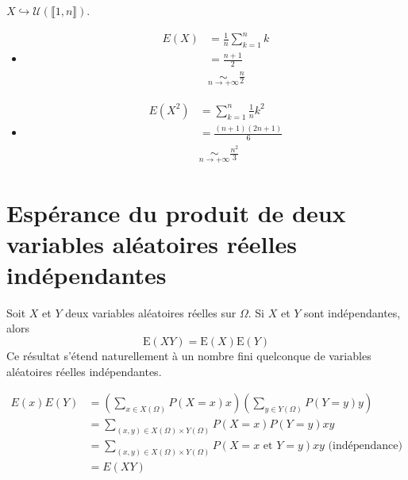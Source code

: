 \documentclass[../main.tex]{subfiles}
\begin{document}
\noindent $X\hookrightarrow \mathcal{U}(\llbracket 1, n \rrbracket)$. 
\begin{itemize}
    \item \begin{align*}
        E(X) &= \frac{1}{n} \sum_{k=1}^{n} k \\
        &= \frac{n+1}{2} \\
        &\underset{n\to +\infty}{\sim} \frac{n}{2}
    \end{align*}
    \item \begin{align*}
        E(X^2) &= \sum_{k=1}^{n} \frac{1}{n} k^2 \\
        &= \frac{(n+1)(2n+1)}{6} \\
        &\underset{n\to +\infty}{\sim} \frac{n^2}{3}
    \end{align*}
\end{itemize}

\section{Espérance du produit de deux variables aléatoires réelles indépendantes}
\begin{tcolorbox}[title=Théorème 33.11, title filled=false, colframe=orange, colback=orange!10!white]
    Soit $X$ et $Y$ deux variables aléatoires réelles sur $\Omega$. Si $X$ et $Y$ sont indépendantes, alors
    $$\mathrm{E}(X Y)=\mathrm{E}(X) \mathrm{E}(Y)$$
    Ce résultat s'étend naturellement à un nombre fini quelconque de variables aléatoires réelles indépendantes.
\end{tcolorbox}

\begin{align*}
    E(x)E(Y) &= \left( \sum_{x\in X(\Omega)} P(X=x) x \right) \left( \sum_{y\in Y(\Omega)} P(Y=y) y \right) \\
    &= \sum_{(x, y)\in X(\Omega) \times Y(\Omega)} P(X=x) P(Y=y) x y \\
    &= \sum_{(x, y)\in X(\Omega) \times Y(\Omega)} P(X=x \text{ et } Y=y) x y \text{ (indépendance)} \\
    &= E(XY)
\end{align*}

\end{document}
